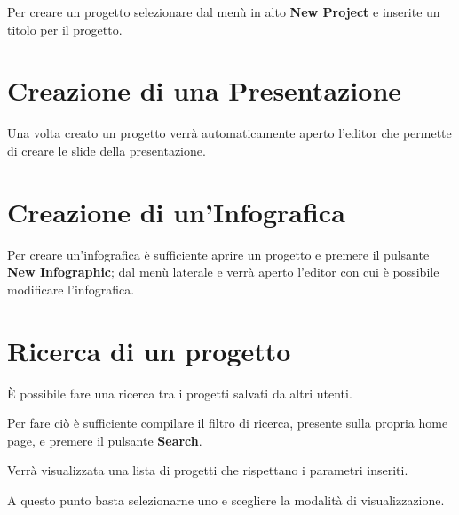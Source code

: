 \noindent Per creare un progetto selezionare dal menù in alto \textbf{New Project} e inserite un titolo per il progetto.


\section{Creazione di una Presentazione}

Una volta creato un progetto verrà automaticamente aperto l'editor che permette di creare le \gls{slide} della presentazione.

\section{Creazione di un'Infografica}

Per creare un'\gls{infografica} è sufficiente aprire un progetto e premere il pulsante \textbf{New Infographic}; dal menù laterale e verrà aperto l'editor con cui è possibile modificare l'\gls{infografica}.

\section{Ricerca di un progetto}

È possibile fare una ricerca tra i progetti salvati da altri utenti.

\noindent Per fare ciò è sufficiente compilare il filtro di ricerca, presente sulla propria home page, e premere il pulsante \textbf{Search}.

Verrà visualizzata una lista di progetti che rispettano i parametri inseriti.

\noindent A questo punto basta selezionarne uno e scegliere la modalità di visualizzazione.
